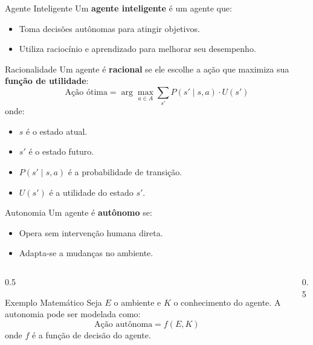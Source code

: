 \documentclass{beamer}
\begin{document}
\begin{frame}{Agente Inteligente}
\footnotesize
Um \textbf{agente inteligente} é um agente que:
\begin{itemize}
    \item Toma decisões autônomas para atingir objetivos.
    \item Utiliza raciocínio e aprendizado para melhorar seu desempenho.
\end{itemize}

\begin{block}{Racionalidade}
Um agente é \textbf{racional} se ele escolhe a ação que maximiza sua \textbf{função de utilidade}:
\[
\text{Ação ótima} = \arg\max_{a \in A} \sum_{s'} P(s' \mid s, a) \cdot U(s')
\]
onde:
\begin{itemize}
    \item \( s \) é o estado atual.
    \item \( s' \) é o estado futuro.
    \item \( P(s' \mid s, a) \) é a probabilidade de transição.
    \item \( U(s') \) é a utilidade do estado \( s' \).
\end{itemize}
\end{block}
\end{frame}



\begin{frame}{Autonomia}
\footnotesize
Um agente é \textbf{autônomo} se:
\begin{itemize}
    \item Opera sem intervenção humana direta.
    \item Adapta-se a mudanças no ambiente.
\end{itemize}
 \begin{columns}
        \begin{column}{0.5\textwidth}
            \begin{exampleblock}{Exemplo Matemático}
Seja \( E \) o ambiente e \( K \) o conhecimento do agente. A autonomia pode ser modelada como:
\[
\text{Ação autônoma} = f(E, K)
\]
onde \( f \) é a função de decisão do agente.
\end{exampleblock}
        \end{column}

        \begin{column}{0.5\textwidth}
        \end{column}
    \end{columns}
\end{frame}
\end{document}
